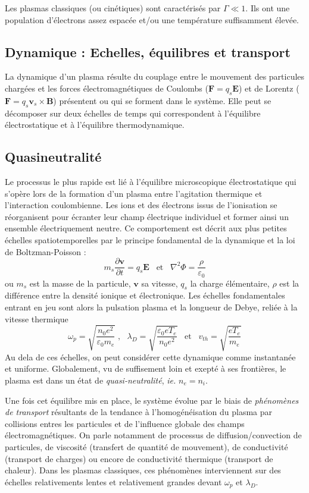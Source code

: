 			Les plasmas classiques (ou cinétiques) sont caractérisés par
			$\Gamma\ll 1$. Ils ont une population d'électrons assez espacée et/ou une
			température suffisamment élevée.
			
		\subsection{Dynamique : Echelles, équilibres et transport}
		La dynamique d'un plasma résulte du couplage entre le mouvement des
		particules chargées et les forces électromagnétiques de Coulombs ($\mathbf
		F=q_s\mathbf E$) et de Lorentz ($\mathbf F=q_s\mathbf v_s\times\mathbf B$)
		présentent ou qui se forment dans le système.
		Elle peut se décomposer sur deux échelles de temps qui correspondent à l'équilibre électrostatique
		et à l'équilibre thermodynamique.
		\subsection{Quasineutralité}
			Le processus le plus rapide est lié à
			l'équilibre microscopique électrostatique qui s'opère lors de la formation
			d'un plasma entre l'agitation thermique et l'interaction coulombienne. Les
			ions et des électrons issus de l'ionisation se réorganisent pour écranter
			leur champ électrique individuel et former ainsi un ensemble électriquement neutre. 
			Ce comportement est décrit aux plus petites échelles spatiotemporelles par
			le principe fondamental de la dynamique et la loi de Boltzman-Poisson :
			$$m_s\frac{\partial \mathbf{v}}{\partial t}=q_s\mathbf E
			\;\;\;\text{et}\;\;\;\nabla^2\Phi=\frac{\rho}{\varepsilon_0}$$ ou
			$m_s$ est la masse de la particule, $\mathbf{v}$ sa vitesse, $q_s$ la
			charge élémentaire, $\rho$ est la différence entre la densité ionique et
			électronique.
			Les échelles fondamentales entrant en jeu sont alors la pulsation plasma et
			la longueur de Debye, reliée à la vitesse thermique 
			$$\omega_p=\sqrt{\frac{n_0e^2}{\varepsilon_0
			m_e}}\;\text{,}\;\;\;\lambda_D=\sqrt{\frac{\varepsilon_0
			eT_e}{n_0e^2}}\;\;\;\text{et}\;\;\;v_{th}=\sqrt{\frac{eT_e}{m_e}}$$
			Au dela de ces échelles, on peut considérer cette dynamique comme instantanée
			et uniforme. Globalement, vu de suffisement loin et exepté à ses frontières,
			le plasma est dans un état de \emph{quasi-neutralité}, \emph{ie.} $n_e=n_i$.
			
			Une fois cet équilibre mis en place, le système évolue par le biais de
			\emph{phénomènes de transport} résultants de la tendance à
			l'homogénéisation du plasma par collisions entres les particules et de
			l'influence globale des champs électromagnétiques. On parle notamment de
			processus de diffusion/convection de particules, de viscosité (transfert de
			quantité de mouvement), de conductivité (transport de charges) ou encore de
			conductivité thermique (transport de chaleur). Dans les plasmas
			classiques, ces phénomènes interviennent sur des échelles relativements
			lentes et relativement grandes devant $\omega_p$ et $\lambda_D$.
